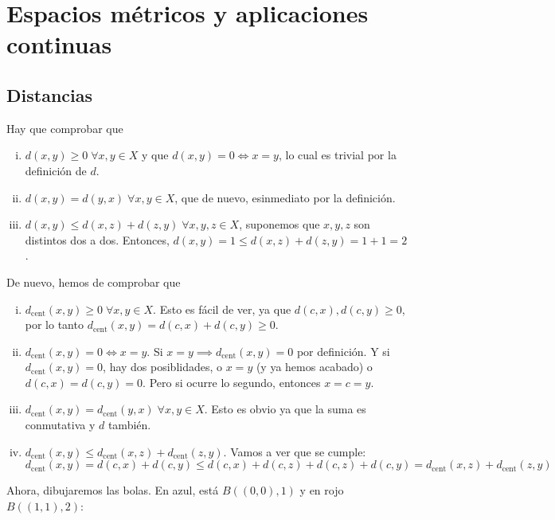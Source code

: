 \chapter{Espacios m\'etricos y aplicaciones continuas}
\section{Distancias}

\begin{eje}
    Hay que comprobar que
    \begin{enumerate}[i)]
        \item $ d(x,y) \geq 0 \; \forall x,y \in X $ y que $ d(x,y) = 0 \iff x = y $, lo cual es trivial por la definición de $ d $.
        \item $ d(x,y) = d(y,x) \; \forall x, y \in X $, que de nuevo, esinmediato por la definición.
        \item $ d(x,y) \leq d(x,z) + d(z,y) \; \forall x, y, z \in X $, suponemos que $ x, y, z $ son distintos dos a dos. Entonces,
            $ d(x,y) = 1 \leq d(x, z) + d(z, y) = 1 + 1 = 2 $.
    \end{enumerate}
\end{eje}

\begin{eje}
    De nuevo, hemos de comprobar que
    \begin{enumerate}[i)]
        \item $d_{\text{cent}}(x, y) \geq 0 \; \forall x, y \in X$. Esto es fácil de ver, ya que $d(c, x), d(c,y) \geq 0$, por lo tanto
            $d_{\text{cent}}(x,y) = d(c,x) + d(c,y) \geq 0$.
        \item $d_{\text{cent}}(x, y) = 0 \iff x = y$. Si $x = y \implies d_{\text{cent}}(x,y) = 0$ por definición. Y si $d_{\text{cent}}(x,y) = 0$,
            hay dos posiblidades, o $x = y$ (y ya hemos acabado) o $d(c, x) = d(c,y) = 0$. Pero si ocurre lo segundo, entonces $x = c = y$.
        \item $d_{\text{cent}}(x, y) = d_{\text{cent}}(y, x) \; \forall x, y \in X$. Esto es obvio ya que la suma es conmutativa y $d$ tambi\'en.
        \item $d_{\text{cent}}(x,y) \leq d_{\text{cent}}(x, z) + d_{\text{cent}}(z, y)$. Vamos a ver que se cumple:
            \[
                d_{\text{cent}}(x, y) = d(c,x) + d(c,y) \leq d(c,x) + d(c,z) + d(c,z) + d(c,y) =
                d_{\text{cent}}(x, z) + d_{\text{cent}}(z,y)
            \]
    \end{enumerate}
    Ahora, dibujaremos las bolas. En azul, está $B\left( (0,0), 1 \right)$ y en rojo $B\left( (1,1), 2 \right)$:
    \begin{center}
        
    \end{center}
\end{eje}

